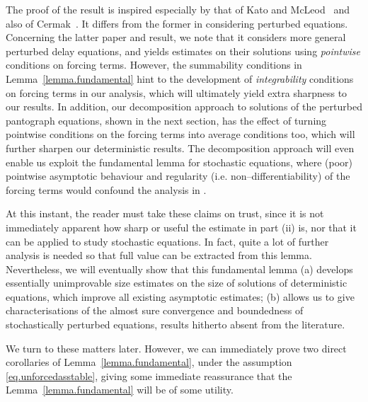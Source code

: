 \documentclass[a4paper,10pt,reqno]{amsart}
\numberwithin{equation}{section}
\theoremstyle{definition}
\theoremstyle{remark}
\DeclareMathOperator{\1}{\mathbbm 1}
\begin{document}
	The proof of the result is inspired especially by that of Kato and McLeod~\cite[Theorem 3(i)]{KatoMc} and also of Cermak~\cite[Lemma 3.3]{cermak}. It differs from the former in considering perturbed equations. Concerning the latter paper and result, we note that it  considers more general perturbed delay equations, and yields estimates on their solutions using \textit{pointwise} conditions on forcing terms. However, the summability conditions in Lemma~\ref{lemma.fundamental} hint to the development of \textit{integrability} conditions on forcing terms in our analysis, which will ultimately yield extra sharpness to our results. In addition, our decomposition approach to solutions of the perturbed pantograph equations, shown in the next section, has the effect of turning pointwise conditions on the forcing terms into average conditions too, which will further sharpen our deterministic results. The decomposition approach will even enable us  exploit the fundamental lemma for stochastic equations, where (poor) pointwise asymptotic behaviour and regularity (i.e. non--differentiability)  of the forcing terms would confound the analysis in \cite{cermak}.    
	
	At this instant, the reader must take these claims on trust, since it is not immediately apparent how sharp or useful the estimate in part (ii) is, nor that it can be applied  to study stochastic equations. In fact, quite a lot of further analysis is needed so that  full value can be extracted from this lemma. Nevertheless, we will eventually show that this fundamental lemma (a) develops essentially unimprovable size estimates on the size of solutions of deterministic equations, which improve all existing asymptotic estimates; (b) allows us to give characterisations of the almost sure convergence and boundedness of stochastically perturbed equations, results hitherto absent from the literature. 
	
	We turn to these matters later. 
	However, we can immediately prove two direct corollaries of Lemma~\ref{lemma.fundamental}, under the assumption \eqref{eq.unforcedasstable}, giving some immediate reassurance that the Lemma~\ref{lemma.fundamental} will be of some utility. 
	
\end{document}
